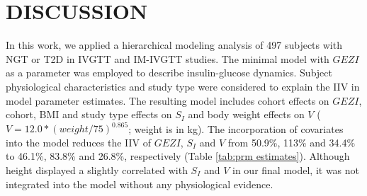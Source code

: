 \documentclass[utf8]{frontiersSCNS} %
\begin{document}
\section{DISCUSSION}
In this work, we applied a hierarchical modeling analysis of 497 subjects with NGT or T2D in IVGTT and IM-IVGTT studies. The minimal model with $GEZI$ as a parameter was employed to describe insulin-glucose dynamics. Subject physiological characteristics and study type were considered to explain the IIV in model parameter estimates. The resulting model includes cohort effects on $GEZI$, cohort, BMI and study type effects on $S_I$ and body weight effects on $V$ ($V=12.0*(weight/75)^{0.865}$; weight is in kg). The incorporation of covariates into the model reduces the IIV of $GEZI$, $S_I$ and $V$ from 50.9\%,  113\% and 34.4\% to 46.1\%, 83.8\% and 26.8\%, respectively (Table \ref{tab:prm estimates}). Although height displayed a slightly correlated with $S_I$ and $V$ in our final model, it was not integrated into the model without any physiological evidence.  
\end{document}
